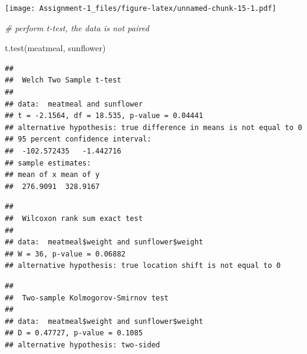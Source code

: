 \documentclass[
]{article}
\newenvironment{Shaded}{\begin{snugshade}}{\end{snugshade}}
\newcommand{\CommentTok}[1]{\textcolor[rgb]{0.56,0.35,0.01}{\textit{#1}}}
\newcommand{\FunctionTok}[1]{\textcolor[rgb]{0.00,0.00,0.00}{#1}}
\newcommand{\NormalTok}[1]{#1}
\newcommand{\SpecialCharTok}[1]{\textcolor[rgb]{0.00,0.00,0.00}{#1}}
\begin{document}
\texttt{[image: Assignment-1\_files/figure-latex/unnamed-chunk-15-1.pdf]}

\begin{Shaded}
\begin{Highlighting}[]
\CommentTok{\# perform t{-}test, the data is not paired}

\FunctionTok{t.test}\NormalTok{(meatmeal, sunflower)}
\end{Highlighting}
\end{Shaded}

\begin{verbatim}
## 
##  Welch Two Sample t-test
## 
## data:  meatmeal and sunflower
## t = -2.1564, df = 18.535, p-value = 0.04441
## alternative hypothesis: true difference in means is not equal to 0
## 95 percent confidence interval:
##  -102.572435   -1.442716
## sample estimates:
## mean of x mean of y 
##  276.9091  328.9167
\end{verbatim}

\begin{Shaded}
\end{Shaded}

\begin{verbatim}
## 
##  Wilcoxon rank sum exact test
## 
## data:  meatmeal$weight and sunflower$weight
## W = 36, p-value = 0.06882
## alternative hypothesis: true location shift is not equal to 0
\end{verbatim}

\begin{Shaded}
\end{Shaded}

\begin{verbatim}
## 
##  Two-sample Kolmogorov-Smirnov test
## 
## data:  meatmeal$weight and sunflower$weight
## D = 0.47727, p-value = 0.1085
## alternative hypothesis: two-sided
\end{verbatim}
\end{document}
